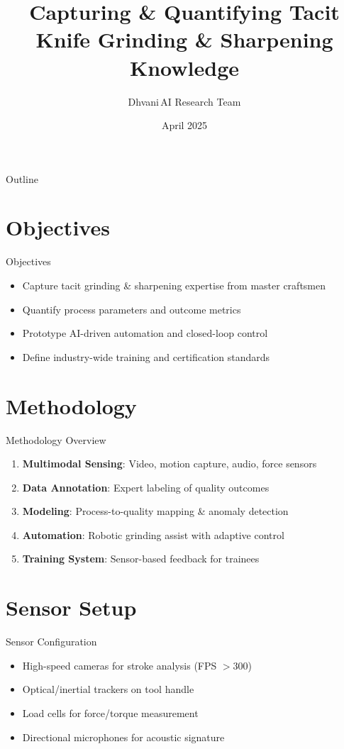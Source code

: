 \documentclass{beamer}
\title[Knife Knowledge Proposal]{Capturing \& Quantifying Tacit Knife Grinding \& Sharpening Knowledge}
\author[Dhvani AI]{Dhvani\,AI Research Team}
\institute[Fukabe Kaji]{In collaboration with Fukabe Kaji Knife Company}
\date{April 2025}
\begin{document}
\begin{frame}
  \titlepage
\end{frame}

\begin{frame}{Outline}
  \tableofcontents
\end{frame}

\section{Objectives}
\begin{frame}{Objectives}
  \begin{itemize}
    \item Capture tacit grinding \& sharpening expertise from master craftsmen
    \item Quantify process parameters and outcome metrics
    \item Prototype AI-driven automation and closed-loop control
    \item Define industry-wide training and certification standards
  \end{itemize}
\end{frame}

\section{Methodology}
\begin{frame}{Methodology Overview}
  \begin{enumerate}
    \item \textbf{Multimodal Sensing}: Video, motion capture, audio, force sensors
    \item \textbf{Data Annotation}: Expert labeling of quality outcomes
    \item \textbf{Modeling}: Process-to-quality mapping \& anomaly detection
    \item \textbf{Automation}: Robotic grinding assist with adaptive control
    \item \textbf{Training System}: Sensor-based feedback for trainees
  \end{enumerate}
\end{frame}

\section{Sensor Setup}
\begin{frame}{Sensor Configuration}
  \begin{itemize}
    \item High-speed cameras for stroke analysis (FPS $>300$)
    \item Optical/inertial trackers on tool handle
    \item Load cells for force/torque measurement
    \item Directional microphones for acoustic signature
  \end{itemize}
\end{frame}
\end{document}
